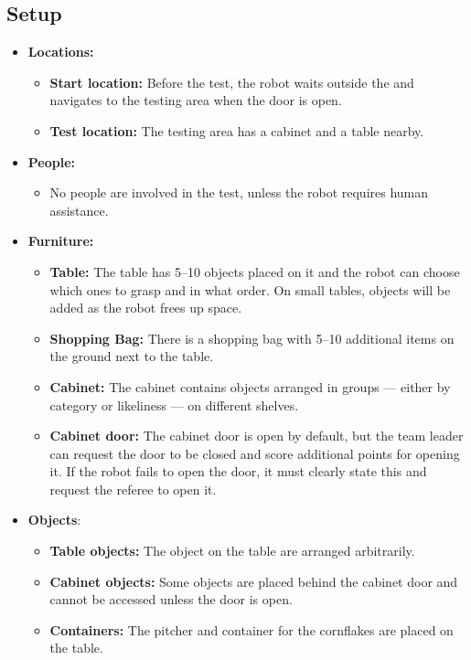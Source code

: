 \subsection*{Setup}
\begin{itemize}
	\item \textbf{Locations:}
		\begin{itemize}
			\item \textbf{Start location:} Before the test, the robot waits outside the \Arena{} and navigates to the testing area when the door is open.
			\item \textbf{Test location:} The testing area has a cabinet and a table nearby.
		\end{itemize}
	\item \textbf{People:}
		\begin{itemize}
			\item No people are involved in the test, unless the robot requires human assistance.
		\end{itemize}
	\item \textbf{Furniture:}
		\begin{itemize}
			\item \textbf{Table:} The table has 5--10 objects placed on it and the robot can choose which ones to grasp and in what order. On small tables, objects will be added as the robot frees up space.
			\item \textbf{Shopping Bag:} There is a shopping bag with 5--10 additional items on the ground next to the table.
			\item \textbf{Cabinet:} The cabinet contains objects arranged in groups --- either by category or likeliness --- on different shelves.
			\item \textbf{Cabinet door:} The cabinet door is open by default, but the team leader can request the door to be closed and score additional points for opening it. If the robot fails to open the door, it must clearly state this and request the referee to open it.
		\end{itemize}
	\item \textbf{Objects}:
		\begin{itemize}
			\item \textbf{Table objects:} The object on the table are arranged arbitrarily.
			\item \textbf{Cabinet objects:} Some objects are placed behind the cabinet door and cannot be accessed unless the door is open.
			\item \textbf{Containers:} The pitcher and container for the cornflakes are placed on the table.
		\end{itemize}
\end{itemize}


